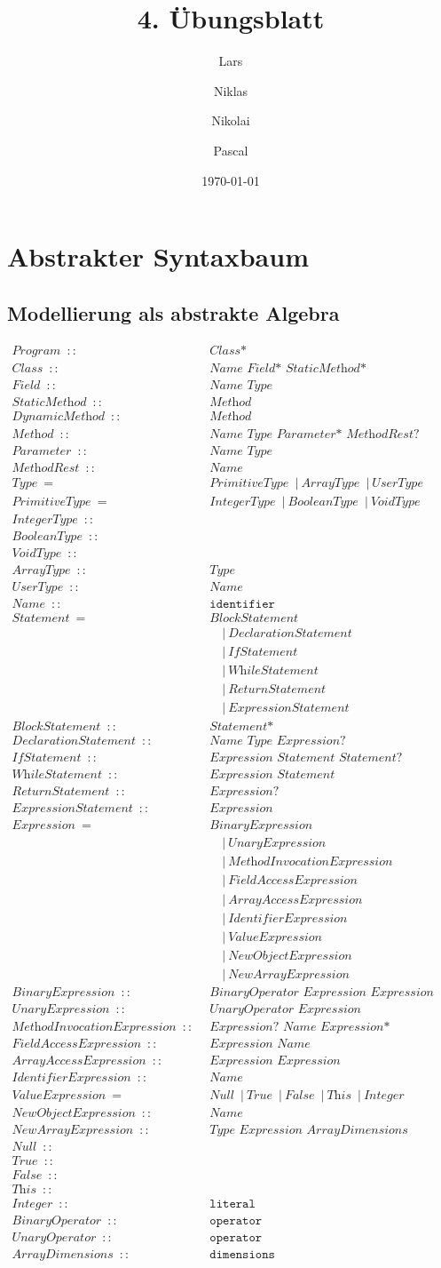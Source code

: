 \documentclass[12pt,a4paper]{scrartcl}
\title{4. Übungsblatt}
\author{Lars \and Niklas \and Nikolai \and Pascal}
\date{\today}
\newcommand{\node}[2]{\textit{#1} \enspace::\enspace &\textit{#2}\\}
\newcommand{\leaf}[2]{\textit{#1} \enspace::\enspace &\texttt{#2}\\}
\newcommand{\kind}[2]{\textit{#1} \enspace=\enspace &\textit{#2}\\}
\renewcommand{\bar}[1]{&\quad | \:\textit{#1}\\}
\newcommand{\kindol}[2]{\textit{#1} \enspace=\enspace &\textit{#2}}
\newcommand{\barol}[1]{\enspace | \:\textit{#1}}
\begin{document}
\allowdisplaybreaks
\def\tor{\textnormal{|}}

\maketitle

\section{Abstrakter Syntaxbaum}

\subsection{Modellierung als abstrakte Algebra}

\begin{align*}
    \node{Program}{Class*}
    \node{Class}{Name Field* StaticMethod* DynamicMethod*}
    \node{Field}{Name Type}
    \node{StaticMethod}{Method}
    \node{DynamicMethod}{Method}
    \node{Method}{Name Type Parameter* MethodRest? Statement*}
    \node{Parameter}{Name Type}
    \node{MethodRest}{Name}
    \kindol{Type}{PrimitiveType}
        \barol{ArrayType}
        \barol{UserType}\\
    \kindol{PrimitiveType}{IntegerType}
        \barol{BooleanType}
        \barol{VoidType}\\
    \leaf{IntegerType}{}
    \leaf{BooleanType}{}
    \leaf{VoidType}{}
    \node{ArrayType}{Type}
    \node{UserType}{Name}
    \leaf{Name}{identifier}
    \kind{Statement}{BlockStatement}
        \bar{DeclarationStatement}
        \bar{IfStatement}
        \bar{WhileStatement}
        \bar{ReturnStatement}
        \bar{ExpressionStatement}
    \node{BlockStatement}{Statement*}
    \node{DeclarationStatement}{Name Type Expression?}
    \node{IfStatement}{Expression Statement Statement?}
    \node{WhileStatement}{Expression Statement}
    \node{ReturnStatement}{Expression?}
    \node{ExpressionStatement}{Expression}
    \kind{Expression}{BinaryExpression}
        \bar{UnaryExpression}
        \bar{MethodInvocationExpression}
        \bar{FieldAccessExpression}
        \bar{ArrayAccessExpression}
        \bar{IdentifierExpression}
        \bar{ValueExpression}
        \bar{NewObjectExpression}
        \bar{NewArrayExpression}
    \node{BinaryExpression}{BinaryOperator Expression Expression}
    \node{UnaryExpression}{UnaryOperator Expression}
    \node{MethodInvocationExpression}{Expression? Name Expression*}
    \node{FieldAccessExpression}{Expression Name}
    \node{ArrayAccessExpression}{Expression Expression}
    \node{IdentifierExpression}{Name}
    \kindol{ValueExpression}{Null}
        \barol{True}
        \barol{False}
        \barol{This}
        \barol{Integer}\\
    \node{NewObjectExpression}{Name}
    \node{NewArrayExpression}{Type Expression ArrayDimensions}
    \leaf{Null}{}
    \leaf{True}{}
    \leaf{False}{}
    \leaf{This}{}
    \leaf{Integer}{literal}
    \leaf{BinaryOperator}{operator}
    \leaf{UnaryOperator}{operator}
    \leaf{ArrayDimensions}{dimensions}
\end{align*}
\end{document}
